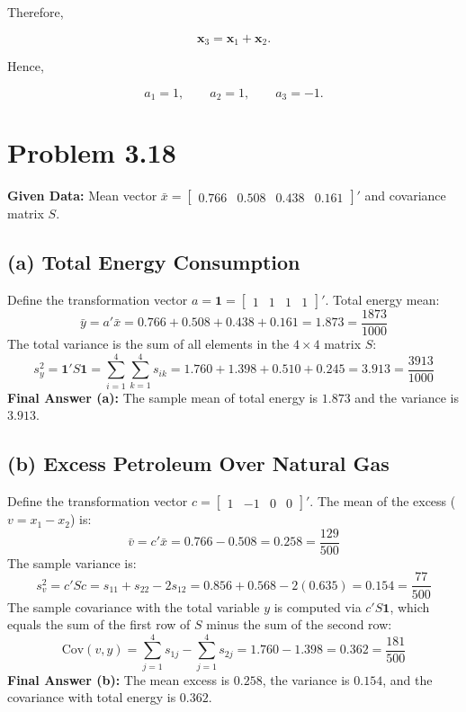 \documentclass{article}
\begin{document}
Therefore,

\[
\boxed{\mathbf x_3=\mathbf x_1+\mathbf x_2}.
\]

Hence,

\[
\boxed{
a_1=1,\qquad
a_2=1,\qquad
a_3=-1}.
\]

\section*{Problem 3.18}
\textbf{Given Data:} Mean vector $\bar{x} = \begin{bmatrix} 0.766 & 0.508 & 0.438 & 0.161 \end{bmatrix}'$ and covariance matrix $S$.

\subsection*{(a) Total Energy Consumption}
Define the transformation vector $a = \mathbf{1} = \begin{bmatrix} 1 & 1 & 1 & 1 \end{bmatrix}'$.
Total energy mean:
$$ \bar{y} = a'\bar{x} = 0.766 + 0.508 + 0.438 + 0.161 = 1.873 = \frac{1873}{1000} $$
The total variance is the sum of all elements in the $4 \times 4$ matrix $S$:
$$ s_y^2 = \mathbf{1}' S \mathbf{1} = \sum_{i=1}^4 \sum_{k=1}^4 s_{ik} = 1.760 + 1.398 + 0.510 + 0.245 = 3.913 = \frac{3913}{1000} $$
\textbf{Final Answer (a):} The sample mean of total energy is $1.873$ and the variance is $3.913$.

\subsection*{(b) Excess Petroleum Over Natural Gas}
Define the transformation vector $c = \begin{bmatrix} 1 & -1 & 0 & 0 \end{bmatrix}'$. 
The mean of the excess ($v = x_1 - x_2$) is:
$$ \bar{v} = c'\bar{x} = 0.766 - 0.508 = 0.258 = \frac{129}{500} $$
The sample variance is:
$$ s_v^2 = c'Sc = s_{11} + s_{22} - 2s_{12} = 0.856 + 0.568 - 2(0.635) = 0.154 = \frac{77}{500} $$
The sample covariance with the total variable $y$ is computed via $c'S\mathbf{1}$, which equals the sum of the first row of $S$ minus the sum of the second row:
$$ \text{Cov}(v, y) = \sum_{j=1}^4 s_{1j} - \sum_{j=1}^4 s_{2j} = 1.760 - 1.398 = 0.362 = \frac{181}{500} $$
\textbf{Final Answer (b):} The mean excess is $0.258$, the variance is $0.154$, and the covariance with total energy is $0.362$.
\end{document}
